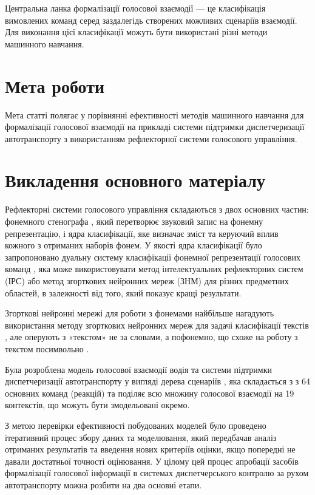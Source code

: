 Центральна ланка формалізації голосової взаємодії — це класифікація вимовлених команд серед заздалегідь створених можливих сценаріїв взаємодії. Для виконання цієї класифікації можуть бути використані різні методи машинного навчання.

\section{Мета роботи}

Мета статті полягає у порівнянні ефективності методів машинного навчання для формалізації голосової взаємодії на прикладі системи підтримки диспетчеризації автотранспорту з використанням рефлекторної системи голосового управління.

\section{Викладення основного матеріалу}

Рефлекторні системи голосового управління складаються з двох основних частин: фонемного стенографа \cite{Pylypenko_2008}, який перетворює звуковий запис на фонемну репрезентацію, і ядра класифікації, яке визначає зміст та керуючий вплив кожного з отриманих наборів фонем. У якості ядра класифікації було запропоновано дуальну систему класифікації фонемної репрезентації голосових команд \cite{art4}, яка може використовувати метод інтелектуальних рефлекторних систем (ІРС) \cite{Egorchenkov_2016} або метод згорткових нейронних мереж (ЗНМ) для різних предметних областей, в залежності від того, який показує кращі результати.

Згорткові нейронні мережі для роботи з фонемами найбільше нагадують використання методу згорткових нейронних мереж для задачі класифікації текстів \cite{Kim_2014}, але оперують з «текстом» не за словами, а пофонемно, що схоже на роботу з текстом посимвольно \cite{Zhang_2015}.

Була розроблена модель голосової взаємодії водія та системи підтримки диспетчеризації автотранспорту у вигляді дерева сценаріїв \cite{art4}, яка складається з з 64 основних команд (реакцій) та поділяє всю множину голосової взаємодії на 19 контекстів, що можуть бути змодельовані окремо.

З метою перевірки ефективності побудованих моделей було проведено ітеративний процес збору даних та моделювання, який передбачав аналіз отриманих результатів та введення нових критеріїв оцінки, якщо попередні не давали достатньої точності оцінювання. У цілому цей процес апробації засобів формалізації голосової інформації в системах диспетчерського контролю за рухом автотранспорту можна розбити на два основні етапи.

